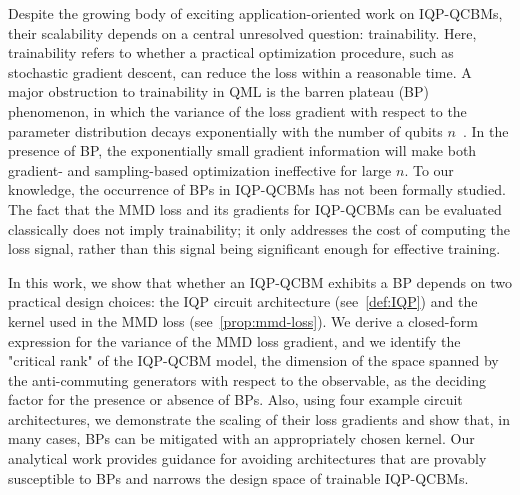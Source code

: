 \documentclass{article}
\theoremstyle{plain}
\theoremstyle{definition}
\theoremstyle{remark}
\begin{document}

Despite the growing body of exciting application-oriented work on IQP-QCBMs, their scalability depends on a central unresolved question: trainability. 
Here, trainability refers to whether 
% 
a practical optimization procedure, such as stochastic gradient descent, can reduce the loss within a reasonable time. 
A major obstruction to trainability in QML is the barren plateau (BP) phenomenon, in which the variance of the loss gradient with respect to the parameter distribution decays exponentially with the number of qubits $n$~\citep{mcclean18,Cerezo21,Holmes22,Larocca25}. In the presence of BP, the exponentially small gradient information will make both gradient- and sampling-based optimization ineffective for large $n$. To our knowledge, the occurrence of BPs in IQP-QCBMs has not been formally studied. The fact that the MMD loss and its gradients for IQP-QCBMs can be evaluated classically does not imply trainability; it only addresses the cost of computing the loss signal, rather than this signal being significant enough for effective training.

In this work, we show that whether an IQP-QCBM exhibits a BP depends on two practical design choices: the IQP circuit architecture (see~\cref{def:IQP}) and the kernel used in the MMD loss (see~\cref{prop:mmd-loss}). We derive a closed-form expression for the variance of the MMD loss gradient, and we identify the "critical rank" of the IQP-QCBM model, the dimension of the space spanned by the anti-commuting generators with respect to the observable, as the deciding factor for the presence or absence of BPs. Also, using four example circuit architectures, we demonstrate the scaling of their loss gradients and show that, in many cases, BPs can be mitigated with an appropriately chosen kernel. Our analytical work provides guidance for avoiding architectures that are provably susceptible to BPs and narrows the design space of trainable IQP-QCBMs.
\end{document}
